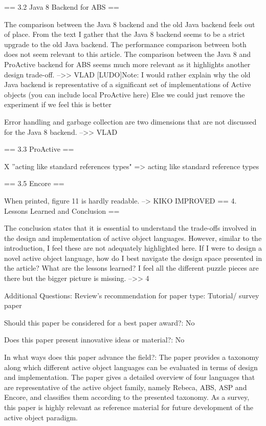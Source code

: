 \documentclass{article}
\begin{document}
== 3.2 Java 8 Backend for ABS ==

The comparison between the Java 8 backend and the old Java backend feels out of place. 
From the text I gather that the Java 8 backend seems to be a strict upgrade to the old 
Java backend. The performance comparison between both does not seem relevant to this 
article.
The comparison between the Java 8 and ProActive backend for ABS seems much more relevant 
as it highlights another design trade-off.
-->> VLAD
[LUDO]Note: I would rather  explain why the old Java backend is representative of a 
significant set of implementations of Active objects (you can include local ProActive 
here)
Else we could just remove the experiment if we feel this is better

Error handling and garbage collection are two dimensions that are not discussed for the 
Java 8 backend.
-->> VLAD

== 3.3 ProActive ==

X ”acting like standard references types" => acting like standard reference types

== 3.5 Encore ==

When printed, figure 11 is hardly readable.
--> KIKO
IMPROVED
== 4. Lessons Learned and Conclusion ==

The conclusion states that it is essential to understand the trade-offs involved in the 
design and implementation of active object languages. However, similar to the 
introduction, I feel these are not adequately highlighted here. If I were to design a 
novel active object language, how do I best navigate the design space presented in the 
article? What are the lessons learned? I feel all the different puzzle pieces are there 
but the bigger picture is missing.
-->> {4}

Additional Questions:
Review's recommendation for paper type: Tutorial/ survey paper

Should this paper be considered for a best paper award?: No

Does this paper present innovative ideas or material?: No

In what ways does this paper advance the field?: The paper provides a taxonomy along 
which different active object languages can be evaluated in terms of design and 
implementation. The paper gives a detailed overview of four languages that are 
representative of the active object family, namely Rebeca, ABS, ASP and Encore, and 
classifies them according to the presented taxonomy. As a survey, this paper is highly 
relevant as reference material for future development of the active object paradigm.
\end{document}

